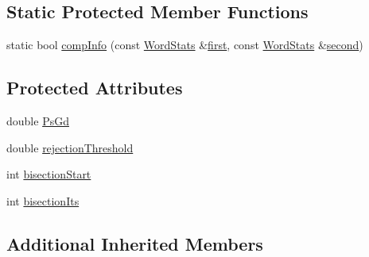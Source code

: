 \subsection*{Static Protected Member Functions}
\begin{DoxyCompactItemize}
\item 
static bool \hyperlink{classcv_1_1of2_1_1FabMapFBO_ad1258c109fdefba48fe74bd3004c18f8}{comp\-Info} (const \hyperlink{structcv_1_1of2_1_1FabMapFBO_1_1WordStats}{Word\-Stats} \&\hyperlink{legacy_8hpp_abb508deecf21698b089fdaf6cf99209d}{first}, const \hyperlink{structcv_1_1of2_1_1FabMapFBO_1_1WordStats}{Word\-Stats} \&\hyperlink{legacy_8hpp_a580692a0f0a0ceba270e5d0ff61df21e}{second})
\end{DoxyCompactItemize}
\subsection*{Protected Attributes}
\begin{DoxyCompactItemize}
\item 
double \hyperlink{classcv_1_1of2_1_1FabMapFBO_a6d86ee7a5e3e7cc053154d0754b45053}{Ps\-Gd}
\item 
double \hyperlink{classcv_1_1of2_1_1FabMapFBO_a32ad6da8dc902456924684f3892d1332}{rejection\-Threshold}
\item 
int \hyperlink{classcv_1_1of2_1_1FabMapFBO_ad08624a1ba605321178bc0a2bc1a4f22}{bisection\-Start}
\item 
int \hyperlink{classcv_1_1of2_1_1FabMapFBO_a6ef71a3e6b08b508bca8e9922a20fd14}{bisection\-Its}
\end{DoxyCompactItemize}
\subsection*{Additional Inherited Members}


